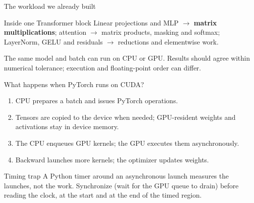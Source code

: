 \documentclass[handout]{beamer}
\begin{document}
\begin{frame}{The workload we already built}
  \begin{center}
  \end{center}
  \begin{block}{Inside one Transformer block}
    Linear projections and MLP $\rightarrow$ \textbf{matrix multiplications}; attention $\rightarrow$ matrix products, masking and softmax; LayerNorm, GELU and residuals $\rightarrow$ reductions and elementwise work.
  \end{block}
  \small The same model and batch can run on CPU or GPU. Results should agree within numerical tolerance; execution and floating-point order can differ.
\end{frame}

\begin{frame}{What happens when PyTorch runs on CUDA?}
  \begin{enumerate}
      \setlength{\itemsep}{7pt}
    \item CPU prepares a batch and issues PyTorch operations.
    \item Tensors are copied to the device when needed; GPU-resident weights and activations stay in device memory.
    \item The CPU enqueues GPU kernels; the GPU executes them asynchronously.
    \item Backward launches more kernels; the optimizer updates weights.
  \end{enumerate}
  \begin{alertblock}{Timing trap}
    A Python timer around an asynchronous launch measures the launches, not the work. Synchronize (wait for the GPU queue to drain) before reading the clock, at the start and at the end of the timed region.
  \end{alertblock}
\end{frame}
\end{document}
